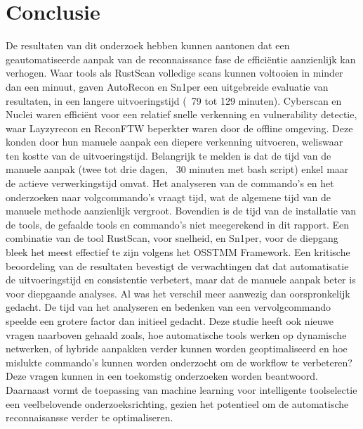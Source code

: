 
\chapter{Conclusie}%
\label{ch:conclusie}


De resultaten van dit onderzoek hebben kunnen aantonen dat een geautomatiseerde aanpak van de reconnaissance fase de efficiëntie aanzienlijk kan verhogen.
Waar tools als RustScan volledige scans kunnen voltooien in minder dan een minuut, gaven AutoRecon en Sn1per een uitgebreide evaluatie van resultaten, in een langere uitvoeringstijd (~79 tot 129 minuten).
Cyberscan en Nuclei waren efficiënt voor een relatief snelle verkenning en vulnerability detectie, waar Layzyrecon en ReconFTW beperkter waren door de offline omgeving.
Deze konden door hun manuele aanpak een diepere verkenning uitvoeren, weliswaar ten kostte van de uitvoeringstijd.
Belangrijk te melden is dat de tijd van de manuele aanpak (twee tot drie dagen, ~30 minuten met bash script) enkel maar de actieve verwerkingstijd omvat.
Het analyseren van de commando's en het onderzoeken naar volgcommando's vraagt tijd, wat de algemene tijd van de manuele methode aanzienlijk vergroot.
Bovendien is de tijd van de installatie van de tools, de gefaalde tools en commando's niet meegerekend in dit rapport.
Een combinatie van de tool RustScan, voor snelheid, en Sn1per, voor de diepgang bleek het meest effectief te zijn volgens het OSSTMM Framework.
Een kritische beoordeling van de resultaten bevestigt de verwachtingen dat dat automatisatie de uitvoeringstijd en consistentie verbetert, maar dat de manuele aanpak beter is voor diepgaande analyses. Al was het verschil meer aanwezig dan oorspronkelijk gedacht.
De tijd van het analyseren en bedenken van een vervolgcommando speelde een grotere factor dan initieel gedacht.
Deze studie heeft ook nieuwe vragen naarboven gehaald zoals, hoe automatische tools werken op dynamische netwerken, of hybride aanpakken verder kunnen worden geoptimaliseerd en hoe mislukte commando's kunnen worden onderzocht om de workflow te verbeteren?
Deze vragen kunnen in een toekomstig onderzoeken worden beantwoord. 
Daarnaast vormt de toepassing van machine learning voor intelligente toolselectie een veelbelovende onderzoeksrichting, gezien het potentieel om de automatische reconnaisansse verder te optimaliseren.

